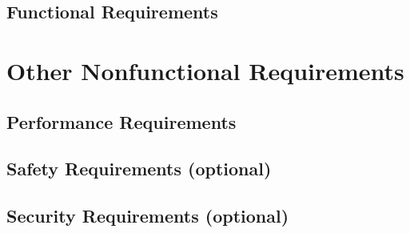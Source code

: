 \documentclass{scrreprt}
\begin{document}
\begin{CJK}{UTF8}{nkai}
\section{Functional Requirements}

\chapter{Other Nonfunctional Requirements}

\section{Performance Requirements}

\section{Safety Requirements (optional)}

\section{Security Requirements (optional)}





\end{CJK}
\end{document}
